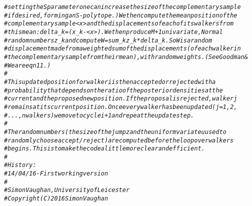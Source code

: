 \documentclass{article}\usepackage[]{graphicx}\usepackage[]{color}
\makeatletter
\newcommand{\hlcom}[1]{\textcolor[rgb]{0.678,0.584,0.686}{\textit{#1}}}%
\newenvironment{kframe}{%
 \def\at@end@of@kframe{}%
 \ifinner\ifhmode%
  \def\at@end@of@kframe{\end{minipage}}%
  \begin{minipage}{\columnwidth}%
 \fi\fi%
 \def\FrameCommand##1{\hskip\@totalleftmargin \hskip-\fboxsep
 \colorbox{shadecolor}{##1}\hskip-\fboxsep
     \hskip-\linewidth \hskip-\@totalleftmargin \hskip\columnwidth}%
 \MakeFramed {\advance\hsize-\width
   \@totalleftmargin\z@ \linewidth\hsize
   \@setminipage}}%
 {\par\unskip\endMakeFramed%
 \at@end@of@kframe}
\newenvironment{knitrout}{}{} %
\makeatother
\begin{document}
\begin{knitrout}
\begin{kframe}
\begin{alltt}
\hlcom{# setting the S parameter one can increase the size of the complementary sample}
\hlcom{# if desired, forming an S-polytope.) We then compute the mean position of the}
\hlcom{# complementary sample <x> and the displacements of each of its walkers from}
\hlcom{# this mean: delta_k = (x_k - <x>). We then produce M+1 univariate, Normal }
\hlcom{# random numbers z_k and compute W = sum_k z_k * delta_k. So W is a random}
\hlcom{# displacement made from a weighted sum of the displacements (of each walker in}
\hlcom{# the complementary sample from their mean), with random weights. (See Goodman &}
\hlcom{# Weare eqn 11.)}
\hlcom{# }
\hlcom{# This updated position for walker i is then accepted or rejected with a}
\hlcom{# probability that depends on the ratio of the posterior densities at the}
\hlcom{# current and the proposed new position. If the proposal is rejected, walker j}
\hlcom{# remains at its current position. Once every walker has been updated (j = 1, 2,}
\hlcom{# ..., nwalkers) we move to cycle i+1 and repeat the update step.}
\hlcom{# }
\hlcom{# The random numbers (the size of the jump z and the uniform variate u used to}
\hlcom{# randomly choose accept/reject) are computed before the loop over walkers}
\hlcom{# begins. This is to make the code a little more clear and efficient.}
\hlcom{#}
\hlcom{# History:}
\hlcom{#  14/04/16 - First working version}
\hlcom{#}
\hlcom{# Simon Vaughan, University of Leicester}
\hlcom{# Copyright (C) 2016 Simon Vaughan}
\end{alltt}
\end{kframe}
\end{knitrout}
\end{document}
